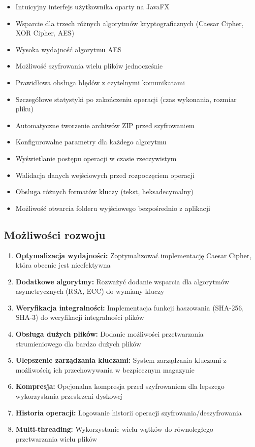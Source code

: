 \documentclass[12pt,a4paper]{article}
\begin{document}
\begin{itemize}
\item Intuicyjny interfejs użytkownika oparty na JavaFX
\item Wsparcie dla trzech różnych algorytmów kryptograficznych (Caesar Cipher, XOR Cipher, AES)
\item Wysoka wydajność algorytmu AES
\item Możliwość szyfrowania wielu plików jednocześnie
\item Prawidłowa obsługa błędów z czytelnymi komunikatami
\item Szczegółowe statystyki po zakończeniu operacji (czas wykonania, rozmiar pliku)
\item Automatyczne tworzenie archiwów ZIP przed szyfrowaniem
\item Konfigurowalne parametry dla każdego algorytmu
\item Wyświetlanie postępu operacji w czasie rzeczywistym
\item Walidacja danych wejściowych przed rozpoczęciem operacji
\item Obsługa różnych formatów kluczy (tekst, heksadecymalny)
\item Możliwość otwarcia folderu wyjściowego bezpośrednio z aplikacji
\end{itemize}

\subsection{Możliwości rozwoju}

\begin{enumerate}
\item \textbf{Optymalizacja wydajności:} Zoptymalizować implementację Caesar Cipher, która obecnie jest nieefektywna
\item \textbf{Dodatkowe algorytmy:} Rozważyć dodanie wsparcia dla algorytmów asymetrycznych (RSA, ECC) do wymiany kluczy
\item \textbf{Weryfikacja integralności:} Implementacja funkcji haszowania (SHA-256, SHA-3) do weryfikacji integralności plików
\item \textbf{Obsługa dużych plików:} Dodanie możliwości przetwarzania strumieniowego dla bardzo dużych plików
\item \textbf{Ulepszenie zarządzania kluczami:} System zarządzania kluczami z możliwością ich przechowywania w bezpiecznym magazynie
\item \textbf{Kompresja:} Opcjonalna kompresja przed szyfrowaniem dla lepszego wykorzystania przestrzeni dyskowej
\item \textbf{Historia operacji:} Logowanie historii operacji szyfrowania/deszyfrowania
\item \textbf{Multi-threading:} Wykorzystanie wielu wątków do równoległego przetwarzania wielu plików
\end{enumerate}
\end{document}
